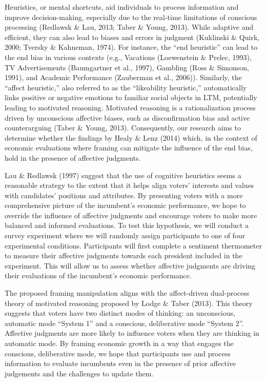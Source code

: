 \documentclass[
]{article}
\begin{document}
Heuristics, or mental shortcuts, aid individuals to process information
and improve decision-making, especially due to the real-time limitations
of conscious processing (Redlawsk \& Lau, 2013; Taber \& Young, 2013).
While adaptive and efficient, they can also lead to biases and errors in
judgment (Kuklinski \& Quirk, 2000; Tversky \& Kahneman, 1974). For
instance, the ``end heuristic'' can lead to the end bias in various
contexts (e.g., Vacations (Loewenstein \& Prelec, 1993), TV
Advertisements (Baumgartner et al., 1997), Gambling (Ross \& Simonson,
1991), and Academic Performance (Zauberman et al., 2006)). Similarly,
the ``affect heuristic,'' also referred to as the ``likeability
heuristic,'' automatically links positive or negative emotions to
familiar social objects in LTM, potentially leading to motivated
reasoning. Motivated reasoning is a rationalization process driven by
unconscious affective biases, such as disconfirmation bias and active
counterarguing (Taber \& Young, 2013). Consequently, our research aims
to determine whether the findings by Healy \& Lenz (2014) which, in the
context of economic evaluations where framing can mitigate the influence
of the end bias, hold in the presence of affective judgments.

Lau \& Redlawsk (1997) suggest that the use of cognitive heuristics
seems a reasonable strategy to the extent that it helps align voters'
interests and values with candidates' positions and attributes. By
presenting voters with a more comprehensive picture of the incumbent's
economic performance, we hope to override the influence of affective
judgments and encourage voters to make more balanced and informed
evaluations. To test this hypothesis, we will conduct a survey
experiment where we will randomly assign participants to one of four
experimental conditions. Participants will first complete a sentiment
thermometer to measure their affective judgments towards each president
included in the experiment. This will allow us to assess whether
affective judgments are driving their evaluations of the incumbent's
economic performance.

The proposed framing manipulation aligns with the affect-driven
dual-process theory of motivated reasoning proposed by Lodge \& Taber
(2013). This theory suggests that voters have two distinct modes of
thinking: an unconscious, automatic mode ``System 1'' and a conscious,
deliberative mode ``System 2''. Affective judgments are more likely to
influence voters when they are thinking in automatic mode. By framing
economic growth in a way that engages the conscious, deliberative mode,
we hope that participants use and process information to evaluate
incumbents even in the presence of prior affective judgements and the
challenges to update them.
\end{document}
